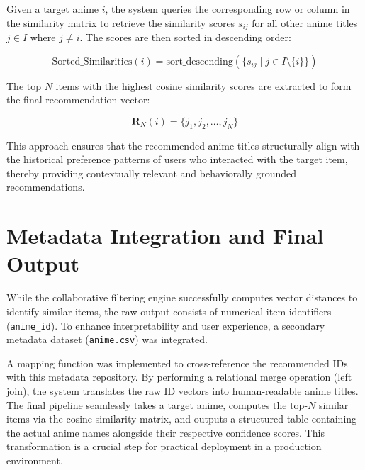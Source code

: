 \documentclass[12pt]{article}
\begin{document}
Given a target anime $i$, the system queries the corresponding row or column in the similarity matrix to retrieve the similarity scores $s_{ij}$ for all other anime titles $j \in I$ where $j \neq i$. The scores are then sorted in descending order:

\begin{equation}
	\text{Sorted\_Similarities}(i) = \text{sort\_descending}(\{s_{ij} \mid j \in I \setminus \{i\}\})
\end{equation}

The top $N$ items with the highest cosine similarity scores are extracted to form the final recommendation vector:

\begin{equation}
	\mathbf{R}_N(i) = \{j_1, j_2, \dots, j_N\}
\end{equation}

This approach ensures that the recommended anime titles structurally align with the historical preference patterns of users who interacted with the target item, thereby providing contextually relevant and behaviorally grounded recommendations.

\section{Metadata Integration and Final Output}
While the collaborative filtering engine successfully computes vector distances to identify similar items, the raw output consists of numerical item identifiers (\texttt{anime\_id}). To enhance interpretability and user experience, a secondary metadata dataset (\texttt{anime.csv}) was integrated. 

A mapping function was implemented to cross-reference the recommended IDs with this metadata repository. By performing a relational merge operation (left join), the system translates the raw ID vectors into human-readable anime titles. The final pipeline seamlessly takes a target anime, computes the top-$N$ similar items via the cosine similarity matrix, and outputs a structured table containing the actual anime names alongside their respective confidence scores. This transformation is a crucial step for practical deployment in a production environment.
	
\end{document}
